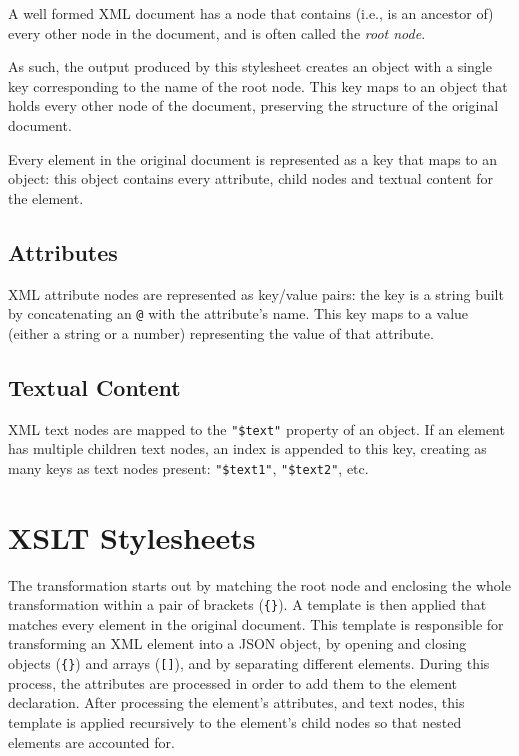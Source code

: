 \documentclass[twocolumn,twoside,10pt,a4paper]{article}
\begin{document}
A well formed XML document has a node that contains (i.e., is an ancestor of) every other node in the document, and is often called the \emph{root node}.

As such, the output produced by this stylesheet creates an object with a single key corresponding to the name of the root node. This key maps to an object that holds every other node of the document, preserving the structure of the original document.

Every element in the original document is represented as a key that maps to an object: this object contains every attribute, child nodes and textual content for the element. 

\subsection{Attributes}

XML attribute nodes are represented as key/value pairs: the key is a string built by concatenating an \verb!@! with the attribute's name. This key maps to a value (either a string or a number) representing the value of that attribute.

\subsection{Textual Content}

XML text nodes are mapped to the \verb!"$text"! property of an object. If an element has multiple children text nodes, an index is appended to this key, creating as many keys as text nodes present: \verb!"$text1"!, \verb!"$text2"!,  etc.

\section{XSLT Stylesheets}\label{sec:xslt-stylesheets}

The transformation starts out by matching the root node and enclosing the whole transformation within a pair of brackets (\verb!{}!). A template is then applied that matches every element in the original document. This template is responsible for transforming an XML element into a JSON object, by opening and closing objects (\verb!{}!) and arrays (\verb![]!), and by separating different elements. During this process, the attributes are processed in order to add them to the element declaration. After processing the element's attributes, and text nodes, this template is applied recursively to the element's child nodes so that nested elements are accounted for.
\end{document}
